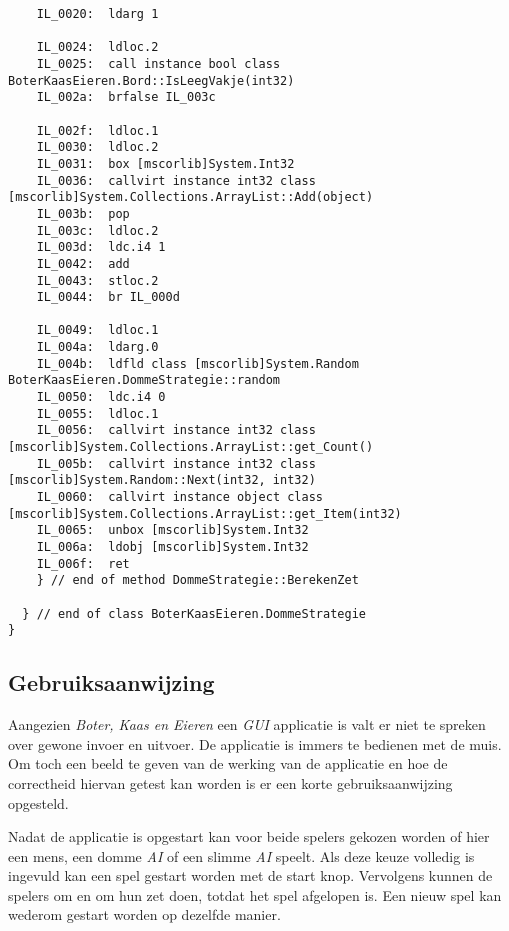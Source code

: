 \begin{lstlisting}
	IL_0020:  ldarg 1

	IL_0024:  ldloc.2 
	IL_0025:  call instance bool class BoterKaasEieren.Bord::IsLeegVakje(int32)
	IL_002a:  brfalse IL_003c

	IL_002f:  ldloc.1 
	IL_0030:  ldloc.2 
	IL_0031:  box [mscorlib]System.Int32
	IL_0036:  callvirt instance int32 class [mscorlib]System.Collections.ArrayList::Add(object)
	IL_003b:  pop 
	IL_003c:  ldloc.2 
	IL_003d:  ldc.i4 1
	IL_0042:  add 
	IL_0043:  stloc.2 
	IL_0044:  br IL_000d

	IL_0049:  ldloc.1 
	IL_004a:  ldarg.0 
	IL_004b:  ldfld class [mscorlib]System.Random BoterKaasEieren.DommeStrategie::random
	IL_0050:  ldc.i4 0
	IL_0055:  ldloc.1 
	IL_0056:  callvirt instance int32 class [mscorlib]System.Collections.ArrayList::get_Count()
	IL_005b:  callvirt instance int32 class [mscorlib]System.Random::Next(int32, int32)
	IL_0060:  callvirt instance object class [mscorlib]System.Collections.ArrayList::get_Item(int32)
	IL_0065:  unbox [mscorlib]System.Int32
	IL_006a:  ldobj [mscorlib]System.Int32
	IL_006f:  ret 
    } // end of method DommeStrategie::BerekenZet

  } // end of class BoterKaasEieren.DommeStrategie
}
\end{lstlisting}

\subsection{Gebruiksaanwijzing}
Aangezien \textit{Boter, Kaas en Eieren} een \textit{GUI} applicatie is valt er niet te spreken over gewone invoer en uitvoer. De applicatie is immers te bedienen met de muis. Om toch een beeld te geven van de werking van de applicatie en hoe de correctheid hiervan getest kan worden is er een korte gebruiksaanwijzing opgesteld.

Nadat de applicatie is opgestart kan voor beide spelers gekozen worden of hier een mens, een domme \textit{AI} of een slimme \textit{AI} speelt. Als deze keuze volledig is ingevuld kan een spel gestart worden met de start knop. Vervolgens kunnen de spelers om en om hun zet doen, totdat het spel afgelopen is. Een nieuw spel kan wederom gestart worden op dezelfde manier.
